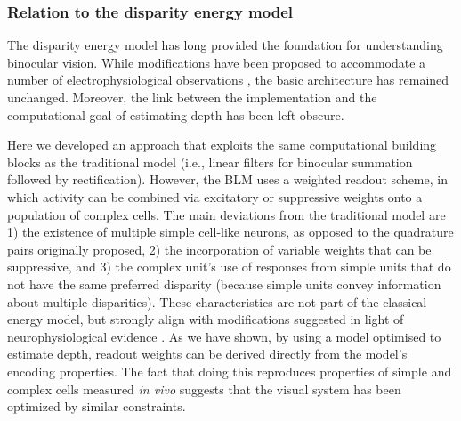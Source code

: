 \subsubsection*{Relation to the disparity energy model}

The disparity energy model \cite{Ohzawa:1990cq, Fleet:1996tq, Qian:1997bu} has long provided the foundation for understanding binocular vision. While modifications have been proposed to accommodate a number of electrophysiological observations \cite{Read:2002kx,Haefner:2008jg,Samonds:2013cs}, the basic architecture has remained unchanged. Moreover, the link between the implementation and the computational goal of estimating depth has been left obscure.

Here we developed an approach that exploits the same computational building blocks as the traditional model (i.e., linear filters for binocular summation followed by rectification). However, the BLM uses a weighted readout scheme, in which activity can be combined via excitatory or suppressive weights onto a population of complex cells. The main deviations from the traditional model are 1) the existence of multiple simple cell-like neurons, as opposed to the quadrature pairs originally proposed, 2) the incorporation of variable weights that can be suppressive, and 3) the complex unit's use of responses from simple units that do not have the same preferred disparity (because simple units convey information about multiple disparities). These characteristics are not part of the classical energy model, but strongly align with modifications suggested in light of neurophysiological evidence \cite{Haefner:2008jg, Sasaki:2010pi, Tanabe:2011pt, Tanabe:2014ud, Baba:2015ij}. As we have shown, by using a model optimised to estimate depth, readout weights can be derived directly from the model's encoding properties. The fact that doing this reproduces properties of simple and complex cells measured {\it in vivo} suggests that the visual system has been optimized by similar constraints. 

